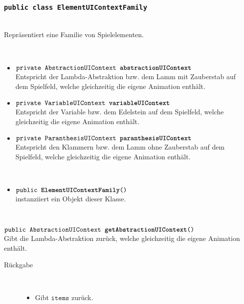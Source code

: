 \begin{description}
		
	\end{description}
			

	\subsubsection{\normalfont \texttt{public class \textbf{ElementUIContextFamily}}}

\begin{description}
\item[Beschreibung] \hfill \\ Repräsentiert eine Familie von Spielelementen. 
\item[Attribute] \hfill \\
	\vspace{-.8cm}
	\begin{itemize}	
		\item $\texttt{private AbstractionUIContext \textbf{abstractionUIContext}}$ \\ Entspricht der Lambda-Abstraktion bzw. dem Lamm mit Zauberstab auf dem Spielfeld, welche gleichzeitig die eigene Animation enthält.
		\item $\texttt{private VariableUIContext \textbf{variableUIContext}}$ \\ Entspricht der Variable bzw. dem Edelstein auf dem Spielfeld, welche gleichzeitig die eigene Animation enthält.
		\item $\texttt{private ParanthesisUIContext \textbf{paranthesisUIContext}}$ \\ Entspricht den Klammern bzw. dem Lamm ohne Zauberstab auf dem Spielfeld, welche gleichzeitig die eigene Animation enthält.
		\end{itemize}
	
\item[Konstruktoren] \hfill \\
	\vspace{-.8cm}
	\begin{itemize}
		\item $\texttt{public \textbf{ElementUIContextFamily}()}$ \\ instanziiert ein Objekt dieser Klasse.

	\end{itemize}
	
\item[Methoden] \hfill \\
	\vspace{-.8cm}
		\item $\texttt{public AbstractionUIContext \textbf{getAbstractionUIContext}()}$ \\ Gibt die Lambda-Abstraktion zurück, welche gleichzeitig die eigene Animation enthält.
		\begin{description}
			\item[Rückgabe] \hfill \\
			\vspace{-.8cm}
			\begin{itemize}
				\item Gibt $\texttt{items}$ zurück.
			\end{itemize}
			\end{description}
			

\end{description}
